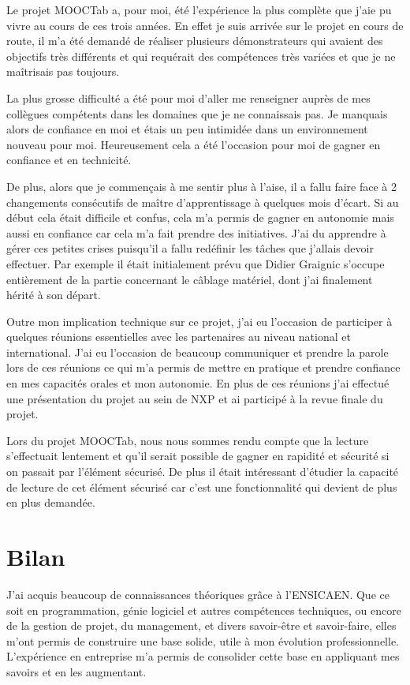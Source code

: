 \documentclass[french,12pt,a4paper,titlepage,openright,openbib]{report}
\begin{document}
Le projet MOOCTab a, pour moi, été l'expérience la plus complète que j'aie pu  vivre au cours de ces trois années. En effet je suis arrivée sur le projet en cours de route, il m'a été demandé de réaliser plusieurs démonstrateurs qui avaient des objectifs très différents et qui requérait des compétences très variées et que je ne maîtrisais pas toujours.

La plus grosse difficulté a été pour moi d'aller me renseigner auprès de mes collègues compétents dans les domaines que je ne connaissais pas. Je manquais alors de confiance en moi et étais un peu intimidée dans un environnement nouveau pour moi. Heureusement cela a été l'occasion pour moi de gagner en confiance et en technicité.

De plus, alors que je commençais à me sentir plus à l'aise, il a fallu faire face à 2 changements consécutifs de maître d'apprentissage à quelques mois d'écart. Si au début cela était difficile et confus, cela m'a permis de gagner en autonomie mais aussi en confiance car cela m'a fait prendre des initiatives. J'ai du apprendre à gérer ces petites crises puisqu'il a fallu redéfinir les tâches que j'allais devoir effectuer. Par exemple il était initialement prévu que Didier Graignic s'occupe entièrement de la partie concernant le câblage matériel, dont j'ai finalement hérité à son départ.

Outre mon implication technique sur ce projet, j'ai eu l'occasion de participer à quelques réunions essentielles avec les partenaires au niveau national et international. J'ai eu l'occasion de beaucoup communiquer et prendre la parole lors de ces réunions ce qui m'a permis de mettre en pratique et prendre confiance en mes capacités orales et mon autonomie.
En plus de ces réunions j'ai effectué une présentation du projet au sein de NXP et ai participé à la revue finale du projet.

Lors du projet MOOCTab, nous nous sommes rendu compte que la lecture s'effectuait lentement et qu'il serait possible de gagner en rapidité et sécurité si on passait par l'élément sécurisé. De plus il était intéressant d'étudier la capacité de lecture de cet élément sécurisé car c'est une fonctionnalité qui devient de plus en plus demandée.


\chapter{Bilan}
J'ai acquis beaucoup de connaissances théoriques grâce à l'ENSICAEN. Que ce soit en programmation, génie logiciel et autres compétences techniques, ou encore de la gestion de projet, du management, et divers savoir-être et savoir-faire, elles m'ont permis de construire une base solide, utile à mon évolution professionnelle.
L'expérience en entreprise m'a permis de consolider cette base en appliquant mes savoirs et en les augmentant.
\end{document}
